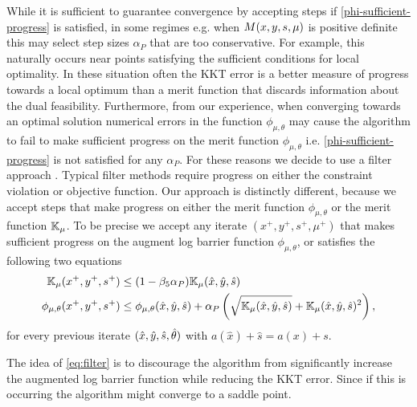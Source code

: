 \documentclass{article}
\begin{document}
While it is sufficient to guarantee convergence by accepting steps if \eqref{phi-sufficient-progress} is satisfied, in some regimes e.g. when $M(x, y, s, \mu)$ is positive definite this may select step sizes $\alpha_{P}$ that are too conservative.  For example, this naturally occurs near points satisfying the sufficient conditions for local optimality. In these situation often the KKT error is a better measure of progress towards a local optimum than a merit function that discards information about the dual feasibility. Furthermore, from our experience, when converging towards an optimal solution numerical errors in the function $\phi_{\mu,\theta}$ may cause the algorithm to fail to make sufficient progress on the merit function $\phi_{\mu,\theta}$ i.e. \eqref{phi-sufficient-progress} is not satisfied for any $\alpha_{P}$. For these reasons we decide to use a filter approach \cite{fletcher2002nonlinear,wachter2006implementation}. Typical filter methods \cite{fletcher2002nonlinear} require progress on either the constraint violation or objective function. Our approach is distinctly different, because we accept steps that make progress on either the merit function $\phi_{\mu,\theta}$ or the merit function $\mathbb{K}_{\mu}$.
To be precise we accept any iterate $(x^{+}, y^{+}, s^{+}, \mu^{+})$ that makes sufficient progress on the augment log barrier function $\phi_{\mu,\theta}$, or satisfies the following two equations
\begin{subequations}\label{eq:filter}
\begin{flalign}
\mathbb{K}_{\mu} (x^{+}, y^{+}, s^{+}) &\le (1 - \beta_{5} \alpha_{P} ) \mathbb{K}_{\mu} (\hat{x}, \hat{y}, \hat{s}) \\
\phi_{\mu,\theta}(x^{+}, y^{+}, s^{+}) &\le \phi_{\mu,\theta}(\hat{x}, \hat{y}, \hat{s}) + \alpha_{P} \left( \sqrt{\mathbb{K}_{\mu} (\hat{x}, \hat{y}, \hat{s})} + \mathbb{K}_{\mu} (\hat{x}, \hat{y}, \hat{s})^2 \right),
\end{flalign} %
\end{subequations}
 for every previous iterate $(\hat{x}, \hat{y}, \hat{s}, \hat{\theta})$ with $a(\hat{x}) + \hat{s} = a(x) + s$.

The idea of \eqref{eq:filter} is to discourage the algorithm from significantly increase the augmented log barrier function while reducing the KKT error. Since if this is occurring the algorithm might converge to a saddle point. 
\end{document}
